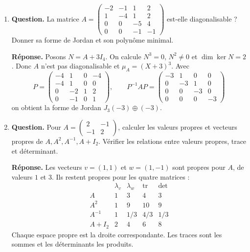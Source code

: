 \documentclass[12pt, a4paper]{article}
\begin{document}
\begin{enumerate}[label=9.\arabic*., start=94]
  \item \begin{minipage}[t]{\linewidth}\raggedright
\textbf{Question.} La matrice $\displaystyle A=\begin{pmatrix}-2&-1&1&2\\1&-4&1&2\\0&0&-5&4\\0&0&-1&-1\end{pmatrix}$ est-elle diagonalisable ? Donner sa forme de Jordan et son polynôme minimal.
\par\smallskip
\textbf{Réponse.} Posons $N=A+3I_4$. On calcule $N^3=0$, $N^2\neq0$ et $\dim\ker N=2$.
    Donc $A$ n'est pas diagonalisable et $\mu_A=(X+3)^3$.
    Avec
    \[
      P=\begin{pmatrix}-4&1&0&-4\\-4&1&0&0\\0&-2&1&2\\0&-1&0&1\end{pmatrix},\qquad
      P^{-1}AP=\begin{pmatrix}-3&1&0&0\\0&-3&1&0\\0&0&-3&0\\0&0&0&-3\end{pmatrix}
    \]
    on obtient la forme de Jordan $J_3(-3)\oplus(-3)$.
\end{minipage}

  \item \begin{minipage}[t]{\linewidth}\raggedright
\textbf{Question.} Pour $A=\begin{pmatrix}2&-1\\-1&2\end{pmatrix}$, calculer les valeurs propres et vecteurs propres de $A,A^2,A^{-1},A+I_2$. Vérifier les relations entre valeurs propres, trace et déterminant.
\par\smallskip
\textbf{Réponse.} Les vecteurs $v=(1,1)$ et $w=(1,-1)$ sont propres pour $A$, de valeurs $1$ et $3$.
    Ils restent propres pour les quatre matrices :
    \[
      \begin{array}{c|cc|cc}
        &\lambda_v&\lambda_w&\operatorname{tr}&\det\\\hline
        A&1&3&4&3\\ A^2&1&9&10&9\\ A^{-1}&1&1/3&4/3&1/3\\ A+I_2&2&4&6&8
      \end{array}
    \]
    Chaque espace propre est la droite correspondante. Les traces sont les sommes et les déterminants les produits.
\end{minipage}


\end{enumerate}
\end{document}
